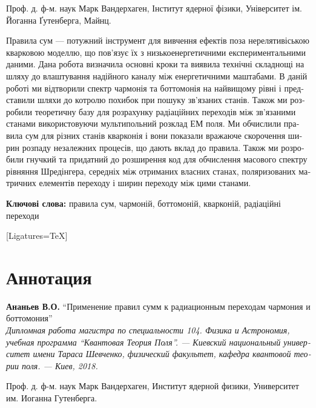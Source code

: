 \begin{titlepage}
\begin{otherlanguage}{ukrainian}
     Проф. д. ф-м. наук Марк Вандерхаген, Інститут ядерної фізики,
Університет ім. Йоганна Ґутенберга, Майнц.

    Правила сум --- потужний інструмент для вивчення ефектів поза нерелятивіською кварковою моделлю, що пов'язує їх з низькоенергетичними експериментальними даними. Дана робота визначила основні кроки та виявила технічні складнощі на шляху до влаштування надійного каналу між енергетичними маштабами. В даній роботі ми відтворили спектр чармонія та боттомонія на найвищому рівні і представили шляхи до котролю похибок при пошуку зв'язаних станів. Також ми розробили теоретичну базу для розрахунку радіаційних переходів між зв'язаними станами використовуючи мультипольний розклад ЕМ поля. Ми обчислили правила сум для різних станів кварконія і вони показали вражаюче скорочення ширин розпаду незалежних процесів, що дають вклад до правила. Також ми розробили гнучкий та придатний до розширення код для обчислення масового спектру рівняння Шредінгера, середніх між отриманих власних станах, поляризованих матричних елементів переходу і ширин переходу між цими станами.

    \noindent \textbf{Ключові слова:} правила сум, чармоній, боттомоній, кварконій, радіаційні переходи
    \end{otherlanguage}
    \vspace{-1cm}
    \begin{otherlanguage}{russian}
    [Ligatures=TeX]
    \section*{Аннотация}
    \textbf{Ананьев В.О.} ``Применение правил сумм к радиационным переходам чармония и боттомония'' \\
    {\itshape Дипломная работа магистра по специальности 104. Физика и Астрономия, учебная программа ``Квантовая Теория Поля''. --- Киевский национальный университет имени Тараса Шевченко, физический факультет, кафедра квантовой теории поля. --- Киев, 2018.}

     Проф. д. ф-м. наук Марк Вандерхаген, Институт ядерной физики,
Университет им. Иоганна Гутенберга.


\end{otherlanguage}
\end{titlepage}
